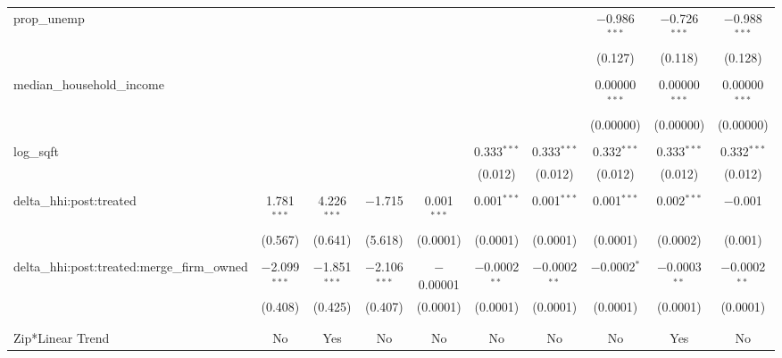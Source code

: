 \begin{table}[H]
{\begin{tabular}{@{\extracolsep{5pt}}lccccccccc}
  prop\_unemp &  &  &  &  &  &  & $-$0.986$^{***}$ & $-$0.726$^{***}$ & $-$0.988$^{***}$ \\  

   &  &  &  &  &  &  & (0.127) & (0.118) & (0.128) \\  

   & & & & & & & & & \\  

  median\_household\_income &  &  &  &  &  &  & 0.00000$^{***}$ & 0.00000$^{***}$ & 0.00000$^{***}$ \\  

   &  &  &  &  &  &  & (0.00000) & (0.00000) & (0.00000) \\  

   & & & & & & & & & \\  

  log\_sqft &  &  &  &  & 0.333$^{***}$ & 0.333$^{***}$ & 0.332$^{***}$ & 0.333$^{***}$ & 0.332$^{***}$ \\  

   &  &  &  &  & (0.012) & (0.012) & (0.012) & (0.012) & (0.012) \\  

   & & & & & & & & & \\  

  delta\_hhi:post:treated & 1.781$^{***}$ & 4.226$^{***}$ & $-$1.715 & 0.001$^{***}$ & 0.001$^{***}$ & 0.001$^{***}$ & 0.001$^{***}$ & 0.002$^{***}$ & $-$0.001 \\  

   & (0.567) & (0.641) & (5.618) & (0.0001) & (0.0001) & (0.0001) & (0.0001) & (0.0002) & (0.001) \\  

   & & & & & & & & & \\  

  delta\_hhi:post:treated:merge\_firm\_owned & $-$2.099$^{***}$ & $-$1.851$^{***}$ & $-$2.106$^{***}$ & $-$0.00001 & $-$0.0002$^{**}$ & $-$0.0002$^{**}$ & $-$0.0002$^{*}$ & $-$0.0003$^{**}$ & $-$0.0002$^{**}$ \\  

   & (0.408) & (0.425) & (0.407) & (0.0001) & (0.0001) & (0.0001) & (0.0001) & (0.0001) & (0.0001) \\  

   & & & & & & & & & \\  

 \hline \\[-1.8ex]  

 Zip*Linear Trend & No & Yes & No & No & No & No & No & Yes & No \\  


\end{tabular}}
\end{table}
